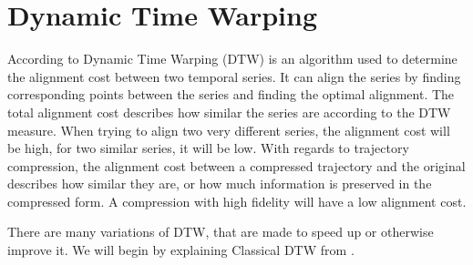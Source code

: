 \section{Dynamic Time Warping}
\label{sec:dtw}
According to \textcite{muller2007dynamic} Dynamic Time Warping (DTW) is an algorithm used to determine the alignment cost between two temporal series. It can align the series by finding corresponding points between the series and finding the optimal alignment. The total alignment cost describes how similar the series are according to the DTW measure. When trying to align two very different series, the alignment cost will be high, for two similar series, it will be low. With regards to trajectory compression, the alignment cost between a compressed trajectory and the original describes how similar they are, or how much information is preserved in the compressed form. A compression with high fidelity will have a low alignment cost.

There are many variations of DTW, that are made to speed up or otherwise improve it. We will begin by explaining Classical DTW from \textcite{muller2007dynamic}.

